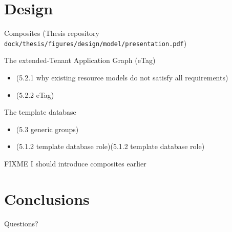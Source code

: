 \section{Design}
\begin{frame}{Composites}
  (Thesis repository \texttt{dock/thesis/figures/design/model/presentation.pdf})
\end{frame}
\begin{frame}{The extended-Tenant Application Graph (eTag)}
  \begin{itemize}
    \item (5.2.1 why existing resource models do not satisfy all requirements)
    \item (5.2.2 eTag)
  \end{itemize}
\end{frame}
\begin{frame}{The template database}
  \begin{itemize}
    \item (5.3 generic groups)
    \item (5.1.2 template database role)(5.1.2 template database role)
  \end{itemize}
\end{frame}
\begin{frame}{FIXME I should introduce composites earlier}
\end{frame}

\section{Conclusions}







\begin{frame}[standout]
  Questions?
\end{frame}

